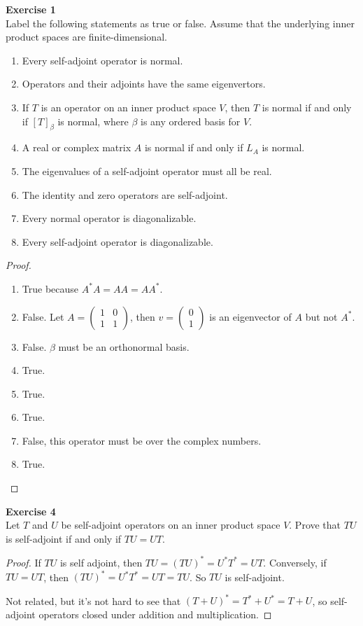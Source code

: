 \documentclass[12pt, a4paper]{article}
\theoremstyle{plain}
\newenvironment{exercise}[2][Exercise]
    { \begin{mdframed}[backgroundcolor=gray!20] \textbf{#1 #2} \\}
    {  \end{mdframed}}
\begin{document}
\begin{exercise}{1}
Label the following statements as true or false. Assume that the underlying inner product spaces are finite-dimensional.
\begin{enumerate}[label=(\alph*)]
\item Every self-adjoint operator is normal.
\item Operators and their adjoints have the same eigenvertors.
\item If $T$ is an operator on an inner product space $V$, then $T$ is normal if and only if $[T]_\beta$ is normal, where $\beta$ is any ordered basis for $V$.
\item A real or complex matrix $A$ is normal if and only if $L_A$ is normal.
\item The eigenvalues of a self-adjoint operator must all be real.
\item The identity and zero operators are self-adjoint.
\item Every normal operator is diagonalizable.
\item Every self-adjoint operator is diagonalizable.
\end{enumerate}
\end{exercise}
	\begin{proof}
	\hfill
	\begin{enumerate}[label=(\alph*)]
	\item True because $A^*A = AA=AA^*$.
	\item False. Let $A = \begin{pmatrix}
	1&0\\
	1&1
	\end{pmatrix}$, then $v=\begin{pmatrix}
	0\\
	1
	\end{pmatrix}$ is an eigenvector of $A$ but not $A^*$.
	\item False. $\beta$ must be an orthonormal basis.
	\item True.
	\item True.
	\item True.
	\item False, this operator must be over the complex numbers.
	\item True.
	\end{enumerate}		
	\end{proof}

\pagebreak

\begin{exercise}{4}
Let $T$ and $U$ be self-adjoint operators on an inner product space $V$. Prove that $TU$ is self-adjoint if and only if $TU=UT$.
\end{exercise}
	\begin{proof}
	If $TU$ is self adjoint, then $TU=(TU)^*=U^*T^*=UT$. Conversely, if $TU=UT$, then $(TU)^*=U^*T^*=UT=TU$. So $TU$ is self-adjoint. 
	
	Not related, but it's not hard to see that $(T+U)^*=T^*+U^*=T+U$, so self-adjoint operators closed under addition and multiplication.  
	\end{proof}
\end{document}
